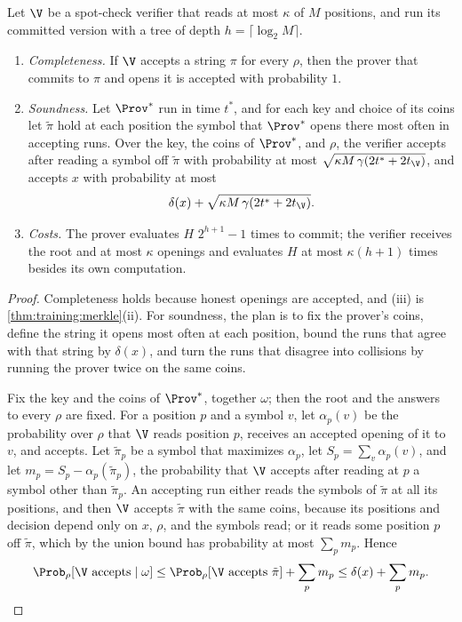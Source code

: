 \begin{refsection}
\begin{theorem}\label{thm:training:committed}
Let $\V$ be a spot-check verifier that reads at most $\kappa$ of $M$ positions, and run its committed version with a tree of depth $h=\lceil\log_2M\rceil$.
\begin{enumerate}
\item \emph{Completeness.} If $\V$ accepts a string $\pi$ for every $\rho$, then the prover that commits to $\pi$ and opens it is accepted with probability $1$.
\item \emph{Soundness.} Let $\Prov^*$ run in time $t^*$, and for each key and choice of its coins let $\tilde\pi$ hold at each position the symbol that $\Prov^*$ opens there most often in accepting runs. Over the key, the coins of $\Prov^*$, and $\rho$, the verifier accepts after reading a symbol off $\tilde\pi$ with probability at most $\sqrt{\kappa M\,\gamma(2t^*+2t_{\V})}$, and accepts $x$ with probability at most
\begin{equation}\label{eq:training:committed}
\delta(x)+\sqrt{\kappa M\,\gamma(2t^*+2t_{\V})}.
\end{equation}
\item \emph{Costs.} The prover evaluates $H$ $2^{h+1}-1$ times to commit; the verifier receives the root and at most $\kappa$ openings and evaluates $H$ at most $\kappa(h+1)$ times besides its own computation.
\end{enumerate}
\end{theorem}

\begin{proof}
Completeness holds because honest openings are accepted, and (iii) is \cref{thm:training:merkle}(ii). For soundness, the plan is to fix the prover's coins, define the string it opens most often at each position, bound the runs that agree with that string by $\delta(x)$, and turn the runs that disagree into collisions by running the prover twice on the same coins.

Fix the key and the coins of $\Prov^*$, together $\omega$; then the root and the answers to every $\rho$ are fixed. For a position $p$ and a symbol $v$, let $\alpha_p(v)$ be the probability over $\rho$ that $\V$ reads position $p$, receives an accepted opening of it to $v$, and accepts. Let $\tilde\pi_p$ be a symbol that maximizes $\alpha_p$, let $S_p=\sum_v\alpha_p(v)$, and let $m_p=S_p-\alpha_p(\tilde\pi_p)$, the probability that $\V$ accepts after reading at $p$ a symbol other than $\tilde\pi_p$. An accepting run either reads the symbols of $\tilde\pi$ at all its positions, and then $\V$ accepts $\tilde\pi$ with the same coins, because its positions and decision depend only on $x$, $\rho$, and the symbols read; or it reads some position $p$ off $\tilde\pi$, which by the union bound has probability at most $\sum_pm_p$. Hence
\begin{equation}\label{eq:training:split}
\Prob_\rho[\V\text{ accepts}\mid\omega]\le\Prob_\rho[\V\text{ accepts }\tilde\pi]+\sum_pm_p\le\delta(x)+\sum_pm_p.
\end{equation}


\end{proof}
\end{refsection}
